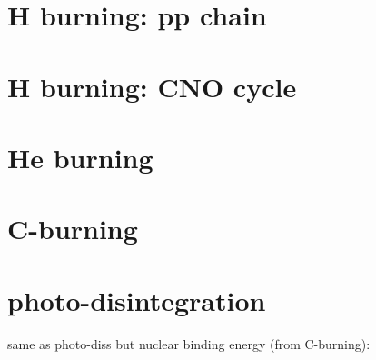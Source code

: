 \section{H burning: pp chain}

\section{H burning: CNO cycle}

\section{He burning}

\section{C-burning}

\section{photo-disintegration}
same as photo-diss but nuclear binding energy (from C-burning): 
